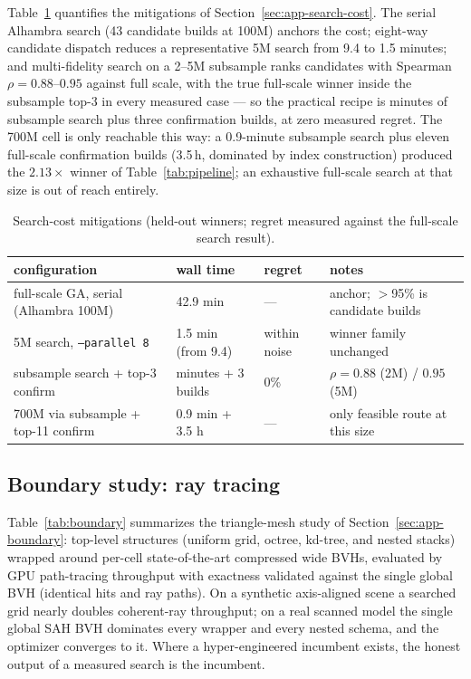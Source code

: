 Table~\ref{tab:searchcost} quantifies the mitigations of Section~\ref{sec:app-search-cost}. The serial Alhambra search (43 candidate builds at 100M) anchors the cost; eight-way candidate dispatch reduces a representative 5M search from 9.4 to 1.5 minutes; and multi-fidelity search on a 2--5M subsample ranks candidates with Spearman $\rho = 0.88$--$0.95$ against full scale, with the true full-scale winner inside the subsample top-3 in every measured case --- so the practical recipe is minutes of subsample search plus three confirmation builds, at zero measured regret. The 700M cell is only reachable this way: a 0.9-minute subsample search plus eleven full-scale confirmation builds (3.5\,h, dominated by index construction) produced the $2.13\times$ winner of Table~\ref{tab:pipeline}; an exhaustive full-scale search at that size is out of reach entirely.

\begin{table}[t]
  \centering
  \caption{Search-cost mitigations (held-out winners; regret measured against the full-scale search result).}
  \label{tab:searchcost}
  \small
  \begin{tabular}{llll}
    \toprule
    configuration & wall time & regret & notes \\
    \midrule
    full-scale GA, serial (Alhambra 100M)   & 42.9 min & --- & anchor; $>$95\% is candidate builds \\
    5M search, \texttt{--parallel 8}        & 1.5 min (from 9.4) & within noise & winner family unchanged \\
    subsample search + top-3 confirm        & minutes + 3 builds & 0\% & $\rho=0.88$ (2M) / $0.95$ (5M) \\
    700M via subsample + top-11 confirm     & 0.9 min + 3.5 h & --- & only feasible route at this size \\
    \bottomrule
  \end{tabular}
\end{table}

\subsection{Boundary study: ray tracing}
\label{sec:eval-boundary}

Table~\ref{tab:boundary} summarizes the triangle-mesh study of Section~\ref{sec:app-boundary}: top-level structures (uniform grid, octree, kd-tree, and nested stacks) wrapped around per-cell state-of-the-art compressed wide BVHs, evaluated by GPU path-tracing throughput with exactness validated against the single global BVH (identical hits and ray paths). On a synthetic axis-aligned scene a searched grid nearly doubles coherent-ray throughput; on a real scanned model the single global SAH BVH dominates every wrapper and every nested schema, and the optimizer converges to it. Where a hyper-engineered incumbent exists, the honest output of a measured search is the incumbent.

